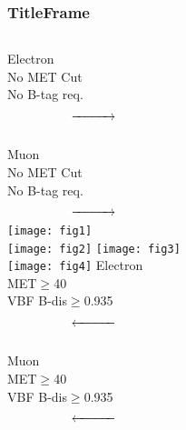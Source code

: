 \begin{frame}\frametitle{TitleFrame}
\begin{columns}[T]
\tiny{
Electron\\No MET Cut\\No B-tag req.}\\		
\[ \xrightarrow{\hspace*{1cm}} \]
\vspace{2cm}\\
\tiny{
Muon\\No MET Cut\\No B-tag req.\\}
\[ \xrightarrow{\hspace*{1cm}} \]
\centering
\texttt{[image: fig1]}\\
\texttt{[image: fig2]}
\centering
\texttt{[image: fig3]}\\
\texttt{[image: fig4]}
\centering
\tiny{
Electron\\MET$\ge$40\\VBF B-dis$\ge$0.935}\\
\[ \xleftarrow{\hspace*{1cm}} \]
\vspace{2cm}\\
\tiny{
Muon\\MET$\ge$40\\VBF B-dis$\ge$0.935}\\
\[ \xleftarrow{\hspace*{1cm}} \]
\end{columns}
\end{frame}

